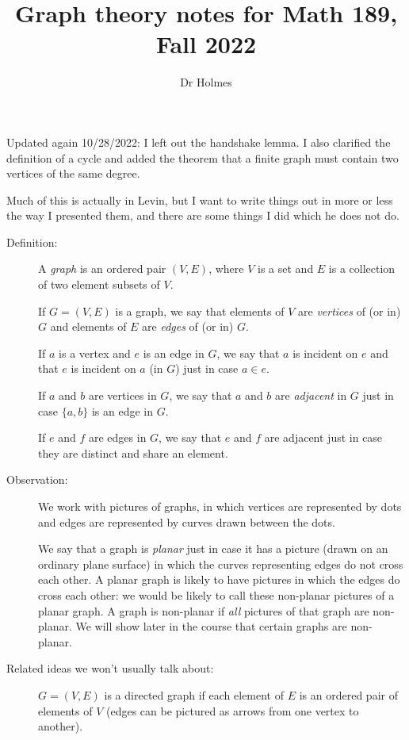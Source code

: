 \documentclass[12pt]{article}
\title{Graph theory notes for Math 189, Fall 2022}
\author{Dr Holmes}
\begin{document}
\maketitle

Updated again 10/28/2022:  I left out the handshake lemma.  I also clarified the definition of a cycle and added the theorem that a finite graph must contain two vertices of the same degree.

Much of this is actually in Levin, but I want to write things out in more or less the way I presented them, and there are some things I did which he does not do.

\begin{description}

\item[Definition:]   A {\em graph\/} is an ordered pair $(V,E)$, where $V$ is a set and $E$ is a collection of two element subsets of $V$.

If $G=(V,E)$ is a graph, we say that elements of $V$ are {\em vertices\/} of (or in) $G$ and elements of $E$ are {\em edges\/} of (or in) $G$.

If $a$ is a vertex and $e$ is an edge in $G$, we say that $a$ is incident on $e$ and that $e$ is incident on $a$ (in $G$) just in case $a \in e$.

If $a$ and $b$ are vertices in $G$, we say that $a$ and $b$ are {\em adjacent\/} in $G$ just in case $\{a,b\}$ is an edge in $G$.

If $e$ and $f$ are edges in $G$, we say that $e$ and $f$ are adjacent just in case they are distinct and share an element.

\item[Observation:]  We work with pictures of graphs, in which vertices are represented by dots and edges are represented by curves drawn between the dots.

We say that a graph is {\em planar\/} just in case it has a picture (drawn on an ordinary plane surface) in which the curves representing edges do not cross each other.  A planar graph is likely to have pictures in which the edges do cross each other:  we would be likely to call these non-planar pictures of a planar graph.  A graph is non-planar if {\em all\/} pictures of that graph are non-planar.  We will show later in the course that certain graphs are non-planar.

\item[Related ideas we won't usually talk about:]  $G=(V,E)$ is a directed graph if each element of $E$ is an ordered pair of elements of $V$ (edges can be pictured as arrows from one vertex to another).


\end{description}
\end{document}
